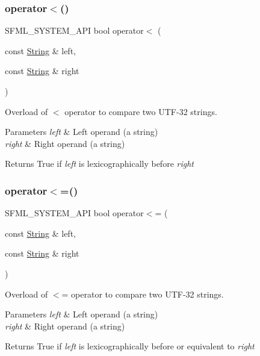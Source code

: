 \subsubsection{\texorpdfstring{operator$<$()}{operator<()}}
{\footnotesize\ttfamily S\+F\+M\+L\+\_\+\+S\+Y\+S\+T\+E\+M\+\_\+\+A\+PI bool operator$<$ (\begin{DoxyParamCaption}\item[{const \hyperlink{classsf_1_1_string}{String} \&}]{left,  }\item[{const \hyperlink{classsf_1_1_string}{String} \&}]{right }\end{DoxyParamCaption})\hspace{0.3cm}{\ttfamily [related]}}



Overload of $<$ operator to compare two U\+T\+F-\/32 strings. 


\begin{DoxyParams}{Parameters}
{\em left} & Left operand (a string) \\
\hline
{\em right} & Right operand (a string)\\
\hline
\end{DoxyParams}
\begin{DoxyReturn}{Returns}
True if {\itshape left} is lexicographically before {\itshape right} 
\end{DoxyReturn}
\mbox{\label{classsf_1_1_string_abd342b6094b81cd086c7929b53b112ae}} 
\subsubsection{\texorpdfstring{operator$<$=()}{operator<=()}}
{\footnotesize\ttfamily S\+F\+M\+L\+\_\+\+S\+Y\+S\+T\+E\+M\+\_\+\+A\+PI bool operator$<$= (\begin{DoxyParamCaption}\item[{const \hyperlink{classsf_1_1_string}{String} \&}]{left,  }\item[{const \hyperlink{classsf_1_1_string}{String} \&}]{right }\end{DoxyParamCaption})\hspace{0.3cm}{\ttfamily [related]}}



Overload of $<$= operator to compare two U\+T\+F-\/32 strings. 


\begin{DoxyParams}{Parameters}
{\em left} & Left operand (a string) \\
\hline
{\em right} & Right operand (a string)\\
\hline
\end{DoxyParams}
\begin{DoxyReturn}{Returns}
True if {\itshape left} is lexicographically before or equivalent to {\itshape right} 
\end{DoxyReturn}
\mbox{\label{classsf_1_1_string_a2a385459fa9a237e61a712fa956d489e}} 
